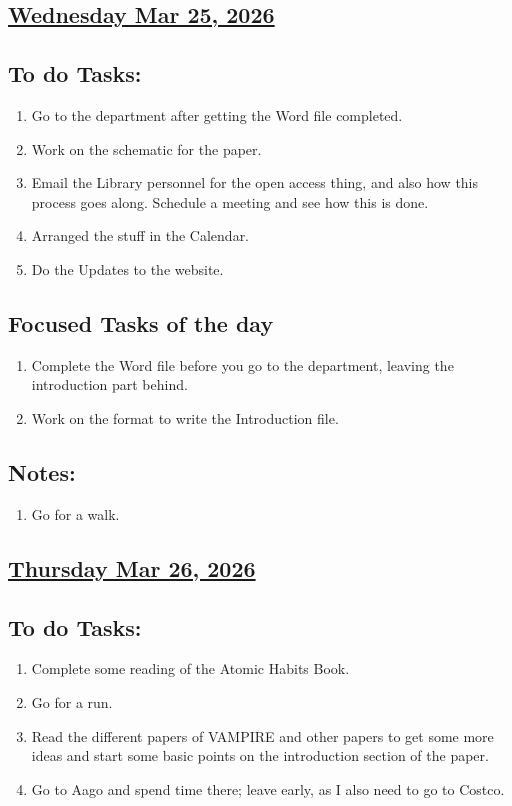 \subsection*{\underline{Wednesday Mar 25, 2026} }
\subsection*{To do Tasks:}
\begin{enumerate}
    \item Go to the department after getting the Word file completed. \cmark
    \item Work on the schematic for the paper. \xmark
    \item Email the Library personnel for the open access thing, and also how this process goes along. Schedule a meeting and see how this is done. \cmark
    \item Arranged the stuff in the Calendar. \cmark
    \item Do the Updates to the website.\cmark
\end{enumerate}
\subsection*{Focused Tasks of the day}
\begin{enumerate}[\ding{212}]  
    \item Complete the Word file before you go to the department, leaving the introduction part behind.
    \item Work on the format to write the Introduction file.
\end{enumerate}
\subsection*{Notes:}
\begin{enumerate}
    \item Go for a walk.
\end{enumerate}
\subsection*{\underline{Thursday Mar 26, 2026}}
\subsection*{To do Tasks:}
\begin{enumerate}
    \item Complete some reading of the Atomic Habits Book. \cmark
    \item Go for a run. \cmark
    \item Read the different papers of VAMPIRE and other papers to get some more ideas and start some basic points on the introduction section of the paper. \cmark 
    \item Go to Aago and spend time there; leave early, as I also need to go to Costco. \cmark
\end{enumerate}
